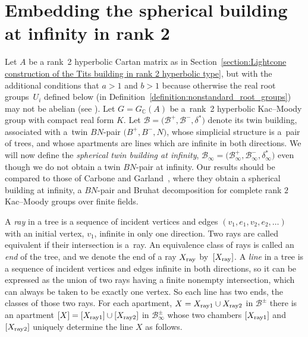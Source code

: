 \documentclass[pdftex]{sigma}
\numberwithin{equation}{section}
\def\C{{\mathbb C}}
\def\cB{\mathcal B}
\begin{document}
\section{Embedding the spherical building at infinity in rank 2}\label{section:Embedding the spherical building at infinity}

Let $A$ be a rank~2 hyperbolic Cartan matrix as in
Section~\ref{section:Lightcone construction of the Tits building in rank 2 hyperbolic type}, but with the additional conditions
that $a>1$ and $b>1$ because otherwise the real root groups~$U_i$ defined below
(in Definition~\ref{definition:nonstandard_root_groups}) may not be abelian (see \cite{CKMS19,Morita88}).
Let $G = G_\C(A)$ be a~rank~2 hyperbolic Kac--Moody group with compact real form $K$. Let $\cB= \big(\cB^+, \cB^-,\delta^*\big)$ denote its twin building, associated with a~twin $BN$-pair $\big(B^+,B^-,N\big)$, whose simplicial structure is a~pair of trees,
and whose apartments are lines which are infinite in both directions.
We will now define the {\em spherical twin building at infinity}, $\cB_\infty = \big(\cB_\infty^+,\cB_\infty^-,\delta_\infty^*\big)$
even though we do not obtain a twin $BN$-pair at infinity.
Our results should be compared to those of Carbone and Garland~\cite{CG2003}, where they obtain a spherical
building at infinity, a $BN$-pair and Bruhat decomposition for complete rank $2$ Kac--Moody groups over finite fields.

A {\em ray} in a tree is a sequence of incident vertices and edges $(v_1,e_1,v_2,e_2,\dots)$ with an initial vertex, $v_1$, infinite in only one direction. Two rays are called equivalent if their intersection is a~ray. An equivalence class of rays is called an {\em end} of the tree, and we denote the end of a ray $X_{\rm ray}$ by~$[X_{\rm ray}]$. A {\em line} in a tree is a sequence of incident vertices and edges infinite in both directions, so it can be expressed as the union of two rays having a finite nonempty intersection, which can always be taken to be exactly one vertex. So each line has two ends, the classes of those two rays. For each apartment, $X = X_{\rm ray1}\cup X_{\rm ray2}$ in $\cB^\pm$ there is an apartment $[X] = [X_{\rm ray1}]\cup [X_{\rm ray2}]$ in $\cB_\infty^\pm$ whose two chambers $[X_{\rm ray1}]$ and $[X_{\rm ray2}]$ uniquely determine the line $X$ as follows.
\end{document}
